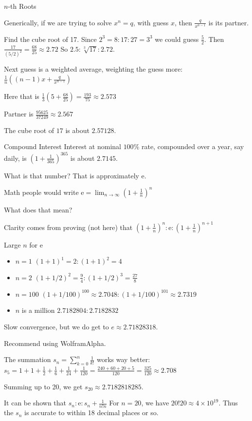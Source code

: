 \documentclass{beamer}
\begin{document}
\begin{frame}{$n$-th Roots}

    Generically,  if we are trying to solve $x^n = q$, with guess $x$, then $\frac{q}{x^{n-1}}$ is its partner. 

    Find the cube root of 17. Since $2^3 = 8 : 17 : 27=3^3$ we could guess $\frac{5}{2}$. Then $\frac{17}{ (5/2)^2 }  = \frac{68}{25} \approx 2.72$  So $2.5:\sqrt[3]{17}:2.72$.

    Next guess is a weighted average, weighting the guess more: $\frac{1}{n} ((n-1) x + \frac{q}{x^{n-1}})$

    Here that is $\frac{1}{3} ( 5 + \frac{68}{25}) = \frac{193}{75} \approx 2.573$

    Partner is $\frac{95625}{37249} \approx 2.567$

    The cube root of $17$ is about $2.57128$. 
\end{frame}


\begin{frame}{Compound Interest}
    Interest at nominal $100\%$ rate, compounded over a year, say daily, is $(1+\frac{1}{365})^{365}$ is about $2.7145$.

    What is that number?  That is approximately $\mathrm{e}$. 

    Math people would write $\mathrm{e} = \lim_{n \to \infty} (1+\frac{1}{n})^n$

    What does that mean? 

    Clarity comes from proving (not here) that $(1+\frac{1}{n})^n : \mathrm{e} : (1+\frac{1}{n})^{n+1}$
    
\end{frame}

\begin{frame}{Large $n$  for e}

\begin{itemize}
    \item $n=1$  $(1+1)^1 = 2 : (1+1)^2 = 4$
    \item $n=2$  $(1+1/2)^2 = \frac{9}{4} : (1+1/2)^3 = \frac{27}{8} $
    \item $n=100$  $(1+ 1/100)^{100} \approx 2.7048 : (1+ 1/100)^{101} \approx 2.7319$  
    \item $n$ is a million  $2.7182804:2.7182832$

\end{itemize}

    Slow convergence, but we do get to $e\approx 2.71828318$.

    Recommend using WolframAlpha. 
    
    The summation $s_n = \sum_{k=0}^{n} \frac{1}{k!}$ works way better: $s_5 = 1 + 1 + \frac{1}{2} + \frac{1}{6} + \frac{1}{24} + \frac{1}{120} = \frac{240 + 60 + 20 + 5}{120} = \frac{325}{120} \approx 2.708$

    Summing up to 20, we get $s_{20} \approx 2.7182818285$. 

    It can be shown that  $s_n : \mathrm{e} : s_n + \frac{1}{n!n}$  For $n=20$, we have $20!20 \approx 4\times 10^{19}$. Thus the $s_n$ is accurate to within 18 decimal places or so. 
    
    
\end{frame}
\end{document}
